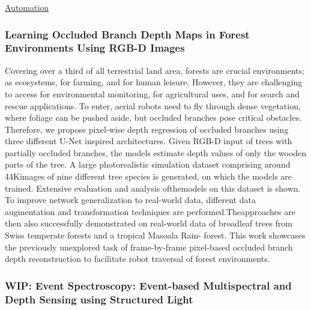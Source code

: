 \underline{Automation}

\subsubsection{Learning Occluded Branch Depth Maps in Forest Environments Using RGB-D Images \cite{Geckeler2024}}
Covering over a third of all terrestrial land area, forests are crucial environments; as ecosystems, for farming, and for human leisure. However, they are challenging to access for environmental monitoring, for agricultural uses, and for search and rescue applications. To enter, aerial robots need to fly through dense vegetation, where foliage can be pushed aside, but occluded branches pose critical obstacles. Therefore, we propose pixel-wise depth regression of occluded branches using three different U-Net inspired architectures. Given RGB-D input of trees with partially occluded branches, the models estimate depth values of only the wooden parts of the tree. A large photorealistic simulation dataset comprising around 44Kimages of nine different tree species is generated, on which the models are trained. Extensive evaluation and analysis ofthemodels on this dataset is shown. To improve network generalization to real-world data, different data augmentation and transformation techniques are performed.Theapproaches are then also successfully demonstrated on real-world data of broadleaf trees from Swiss temperate forests and a tropical Masoala Rain- forest. This work showcases the previously unexplored task of frame-by-frame pixel-based occluded branch depth reconstruction to facilitate robot traversal of forest environments.

\subsubsection{WIP: Event Spectroscopy: Event-based Multispectral and Depth Sensing using Structured Light}

